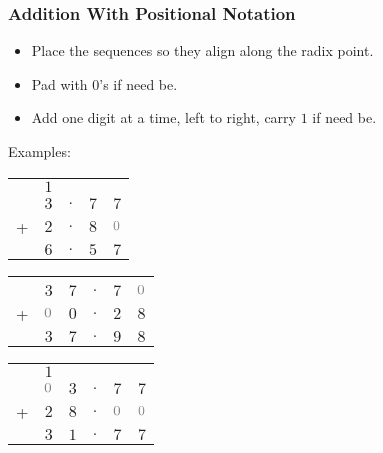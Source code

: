 \begin{frame}

\frametitle{Addition With Positional Notation}

\begin{itemize}

\item Place the sequences so they align along the radix point.

\item Pad with 0's if need be.

\item Add one digit at a time, left to right, carry $1$ if need be.

\end{itemize}

\vspace{\fill}

Examples:

\begin{minipage}{0.3\textwidth}
\begin{center}
{\setlength{\tabcolsep}{1pt}
\begin{tabular}{ccccc}
  & {\scriptsize $1$} \\
  & $3$ & $.$ & $7$ & $7$  \\
+ & $2$ & $.$ & $8$ & ${\color{gray}0}$   \\ \hline
  & $6$ & $.$ & $5$ & $7$
\end{tabular}
}
\end{center}
\end{minipage}%
\begin{minipage}{0.3\textwidth}
\begin{center}
{\setlength{\tabcolsep}{1pt}
\begin{tabular}{cccccc}
  & \\
  & $3$ & $7$ & $.$ & $7$ & ${\color{gray}0}$  \\
+ & ${\color{gray}0}$ & $0$ & $.$ & $2$ & $8$   \\ \hline
  & $3$ & $7$ & $.$ & $9$ & $8$
\end{tabular}
}
\end{center}
\end{minipage}%
\begin{minipage}{0.3\textwidth}
\begin{center}
{\setlength{\tabcolsep}{1pt}
\begin{tabular}{cccccc}
  & {\scriptsize $1$} \\
  & ${\color{gray}0}$ & $3$ & $.$ & $7$ & $7$  \\
+ & $2$ & $8$ & $.$ & ${\color{gray}0}$ & ${\color{gray}0}$ \\ \hline
  & $3$ & $1$ & $.$ & $7$ & $7$
\end{tabular}
}
\end{center}
\end{minipage}

\end{frame}

